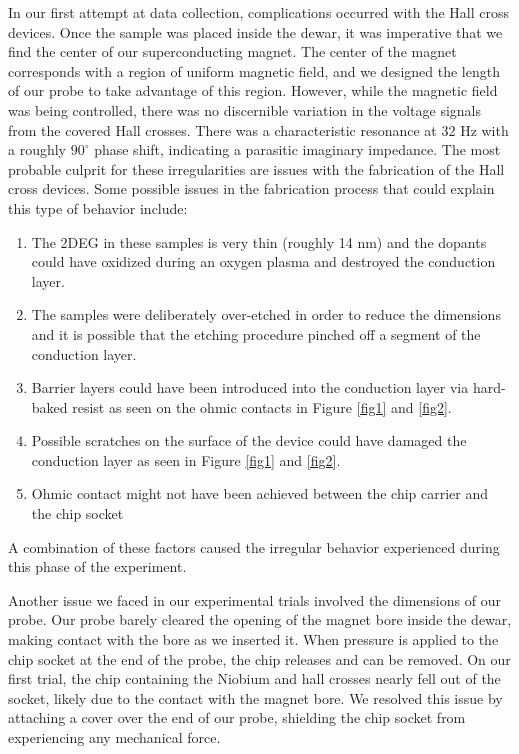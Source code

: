 \documentclass[twocolumn,aps,prl]{revtex4-1} %
\begin{document}
In our first attempt at data collection, complications occurred with the Hall cross devices. Once the sample was placed inside the dewar, it was imperative that we find the center of our superconducting magnet. The center of the magnet corresponds with a region of uniform magnetic field, and we designed the length of our probe to take advantage of this region. However, while the magnetic field was being controlled, there was no discernible variation in the voltage signals from the covered Hall crosses. There was a characteristic resonance at 32 Hz with a roughly $90^\circ$ phase shift, indicating a parasitic imaginary impedance. The most probable culprit for these irregularities are issues with the fabrication of the Hall cross devices. Some possible issues in the fabrication process that could explain this type of behavior include: 
\begin{enumerate}
\item The 2DEG in these samples is very thin (roughly 14 nm) and the dopants could have oxidized during an oxygen plasma and destroyed the conduction layer. 
\item The samples were deliberately over-etched in order to reduce the dimensions and it is possible that the etching procedure pinched off a segment of the conduction layer.
\item Barrier layers could have been introduced into the conduction layer via hard-baked resist as seen on the ohmic contacts in Figure \ref{fig1} and \ref{fig2}.
\item Possible scratches on the surface of the device could have damaged the conduction layer as seen in Figure \ref{fig1} and \ref{fig2}.
\item Ohmic contact might not have been achieved between the chip carrier and the chip socket 
\end{enumerate}
A combination of these factors caused the irregular behavior experienced during this phase of the experiment. 

Another issue we faced in our experimental trials involved the dimensions of our probe. Our probe barely cleared the opening of the magnet bore inside the dewar, making contact with the bore as we inserted it. When pressure is applied to the chip socket at the end of the probe, the chip releases and can be removed. On our first trial, the chip containing the Niobium and hall crosses nearly fell out of the socket, likely due to the contact with the magnet bore. We resolved this issue by attaching a cover over the end of our probe, shielding the chip socket from experiencing any mechanical force.
\end{document}
